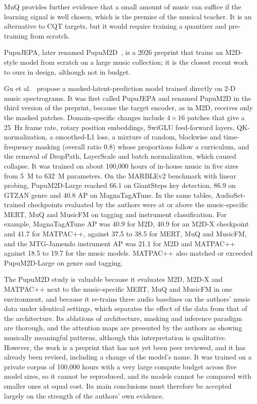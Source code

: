 \documentclass{FastFyp}
\begin{document}
\lrrelation
MuQ provides further evidence that a small amount of music can suffice if the learning signal is well chosen, which is the premise of the musical teacher. It is an alternative to CQT targets, but it would require training a quantizer and pre-training from scratch.

PupuJEPA, later renamed PupuM2D~\cite{ref:Gu:2026pupum2d}, is a 2026 preprint that trains an M2D-style model from scratch on a large music collection; it is the closest recent work to ours in design, although not in budget.

\lrsummary
Gu et al.~\cite{ref:Gu:2026pupum2d} propose a masked-latent-prediction model trained directly on 2-D music spectrograms. It was first called PupuJEPA and renamed PupuM2D in the third version of the preprint, because the target encoder, as in M2D, receives only the masked patches. Domain-specific changes include $4\times16$ patches that give a 25~Hz frame rate, rotary position embeddings, SwiGLU feed-forward layers, QK-normalization, a smoothed-L1 loss, a mixture of random, blockwise and time-frequency masking (overall ratio 0.8) whose proportions follow a curriculum, and the removal of DropPath, LayerScale and batch normalization, which caused collapse. It was trained on about 100,000 hours of in-house music in five sizes from 5~M to 632~M parameters. On the MARBLEv2 benchmark with linear probing, PupuM2D-Large reached 66.1 on GiantSteps key detection, 86.9 on GTZAN genre and 40.8 AP on MagnaTagATune. In the same tables, AudioSet-trained checkpoints evaluated by the authors were at or above the music-specific MERT, MuQ and MusicFM on tagging and instrument classification. For example, MagnaTagATune AP was 40.9 for M2D, 40.9 for an M2D-X checkpoint and 41.7 for MATPAC++, against 37.5 to 38.5 for MERT, MuQ and MusicFM, and the MTG-Jamendo instrument AP was 21.1 for M2D and MATPAC++ against 18.5 to 19.7 for the music models. MATPAC++ also matched or exceeded PupuM2D-Large on genre and tagging.

\lrcritical
The PupuM2D study is valuable because it evaluates M2D, M2D-X and MATPAC++ next to the music-specific MERT, MuQ and MusicFM in one environment, and because it re-trains three audio baselines on the authors' music data under identical settings, which separates the effect of the data from that of the architecture. Its ablations of architecture, masking and inference paradigm are thorough, and the attention maps are presented by the authors as showing musically meaningful patterns, although this interpretation is qualitative. However, the work is a preprint that has not yet been peer reviewed, and it has already been revised, including a change of the model's name. It was trained on a private corpus of 100,000 hours with a very large compute budget across five model sizes, so it cannot be reproduced, and its models cannot be compared with smaller ones at equal cost. Its main conclusions must therefore be accepted largely on the strength of the authors' own evidence.
\end{document}
